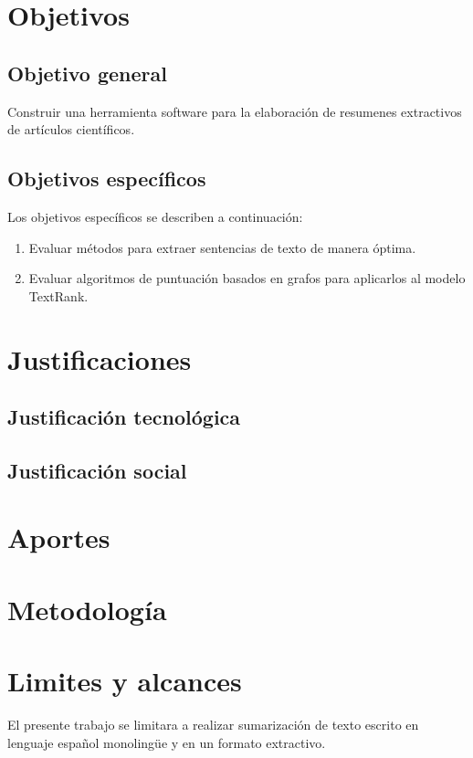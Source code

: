 \section{Objetivos}

\subsection{Objetivo general}
Construir una herramienta software para la elaboraci\'on de resumenes extractivos 
de art\'iculos cient\'ificos.  

\subsection{Objetivos espec\'ificos}
Los objetivos espec\'ificos se describen a continuaci\'on:
\begin{enumerate}
	\item Evaluar m\'etodos para extraer sentencias de texto de manera \'optima.
	\item Evaluar algoritmos de puntuaci\'on basados en grafos para aplicarlos al
	modelo TextRank.
\end{enumerate}

\section{Justificaciones}
\subsection{Justificaci\'on tecnol\'ogica}
\subsection{Justificaci\'on social}

\section{Aportes}

\section{Metodolog\'ia}

\section{Limites y alcances}
El presente trabajo se limitara a realizar sumarizaci\'on de texto escrito en lenguaje
espa\~nol monoling\"ue y en un formato extractivo.
